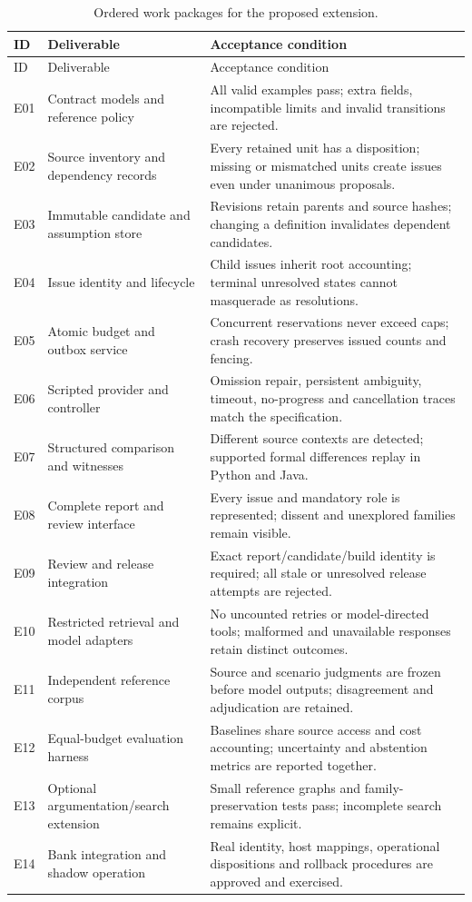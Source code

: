 \documentclass[12pt,a4paper,oneside,openany]{book}
\begin{document}
\begin{longtable}{P{13mm}P{49mm}P{85mm}}
\caption{Ordered work packages for the proposed extension.}\label{tab:extension-tasks}\\
\toprule
ID & Deliverable & Acceptance condition\\\midrule\endfirsthead
\toprule ID & Deliverable & Acceptance condition\\\midrule\endhead
E01 & Contract models and reference policy & All valid examples pass; extra fields, incompatible limits and invalid transitions are rejected.\\
E02 & Source inventory and dependency records & Every retained unit has a disposition; missing or mismatched units create issues even under unanimous proposals.\\
E03 & Immutable candidate and assumption store & Revisions retain parents and source hashes; changing a definition invalidates dependent candidates.\\
E04 & Issue identity and lifecycle & Child issues inherit root accounting; terminal unresolved states cannot masquerade as resolutions.\\
E05 & Atomic budget and outbox service & Concurrent reservations never exceed caps; crash recovery preserves issued counts and fencing.\\
E06 & Scripted provider and controller & Omission repair, persistent ambiguity, timeout, no-progress and cancellation traces match the specification.\\
E07 & Structured comparison and witnesses & Different source contexts are detected; supported formal differences replay in Python and Java.\\
E08 & Complete report and review interface & Every issue and mandatory role is represented; dissent and unexplored families remain visible.\\
E09 & Review and release integration & Exact report/candidate/build identity is required; all stale or unresolved release attempts are rejected.\\
E10 & Restricted retrieval and model adapters & No uncounted retries or model-directed tools; malformed and unavailable responses retain distinct outcomes.\\
E11 & Independent reference corpus & Source and scenario judgments are frozen before model outputs; disagreement and adjudication are retained.\\
E12 & Equal-budget evaluation harness & Baselines share source access and cost accounting; uncertainty and abstention metrics are reported together.\\
E13 & Optional argumentation/search extension & Small reference graphs and family-preservation tests pass; incomplete search remains explicit.\\
E14 & Bank integration and shadow operation & Real identity, host mappings, operational dispositions and rollback procedures are approved and exercised.\\
\bottomrule
\end{longtable}
\end{document}
